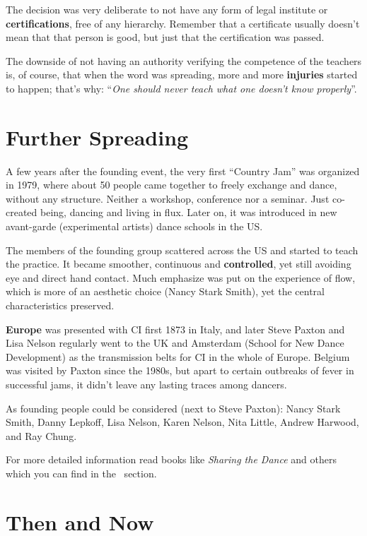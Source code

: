 The decision was very deliberate to not have any form of legal institute or \textbf{certifications}, free of any hierarchy.
Remember that a certificate usually doesn't mean that that person is good, but just that the certification was passed.

The downside of not having an authority verifying the competence of the teachers is, of course, that when the word was spreading, more and more \textbf{injuries} started to happen; that's why: ``\textit{One should never teach what one doesn't know properly}''.

\section{Further Spreading}\label{sec:further-spreading}

A few years after the founding event, the very first ``Country Jam'' was organized in 1979, where about 50 people came together to freely exchange and dance, without any structure.
Neither a workshop, conference nor a seminar.
Just co-created being, dancing and living in flux.
Later on, it was introduced in new avant-garde (experimental artists) dance schools in the US\@.

The members of the founding group scattered across the US and started to teach the practice.
It became smoother, continuous and \textbf{controlled}, yet still avoiding eye and direct hand contact.
Much emphasize was put on the experience of flow, which is more of an aesthetic choice (Nancy Stark Smith), yet the central characteristics preserved.

\textbf{Europe} was presented with CI first 1873 in Italy, and later Steve Paxton and Lisa Nelson regularly went to the UK and Amsterdam (School for New Dance Development) as the transmission belts for CI in the whole of Europe.
Belgium was visited by Paxton since the 1980s, but apart to certain outbreaks of fever in successful jams, it didn't leave any lasting traces among dancers.

As founding people could be considered (next to Steve Paxton): Nancy Stark Smith, Danny Lepkoff, Lisa Nelson, Karen Nelson, Nita Little, Andrew Harwood, and Ray Chung.

For more detailed information read books like \textit{Sharing the Dance} and others which you can find in the~ section.

\section{Then and Now}\label{sec:then-and-now}

